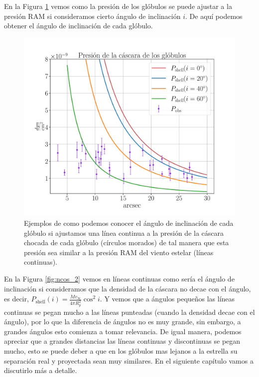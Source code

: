 \documentclass{book}
\begin{document}
En la Figura \ref{graf_presion_ang} vemos como la presión de los
glóbulos se puede ajustar a la presión RAM si consideramos cierto
ángulo de inclinación $i$. De aquí podemos obtener el ángulo de
inclinación de cada
glóbulo.

\begin{figure}[htb]
    \centering
    \includegraphics[width=\textwidth]{imagenes_corregidas/S_52.pdf}
    \caption{Ejemplos de como podemos conocer el ángulo de inclinación
      de cada glóbulo si ajustamos una línea continua a la presión de
      la cáscara chocada de cada glóbulo (círculos morados) de tal
      manera que esta presión sea similar a la presión RAM del viento
      estelar (líneas continuas).}
    \label{graf_presion_ang}
\end{figure}

En la Figura \ref{fig:ncos_2} vemos en líneas continuas como sería el
ángulo de inclinación si consideramos que la densidad de la cáscara no
decae con el ángulo, es decir,
$P_\mathrm{shell}(i)=\frac{\dot{M}v_\infty}{4\pi R_\mathrm{p}^2}\cos^2i$. Y
vemos que a ángulos pequeños las líneas continuas se pegan mucho a las
líneas punteadas (cuando la densidad decae con el ángulo), por lo que
la diferencia de ángulos no es muy grande, sin embargo, a grandes
ángulos esto comienza a tomar relevancia. De igual manera, podemos
apreciar que a grandes distancias las líneas continuas y discontinuas
se pegan mucho, esto se puede deber a que en los glóbulos mas lejanos
a la estrella su separación real y proyectada sean muy similares. En
el siguiente capítulo vamos a discutirlo más a detalle.
\end{document}
